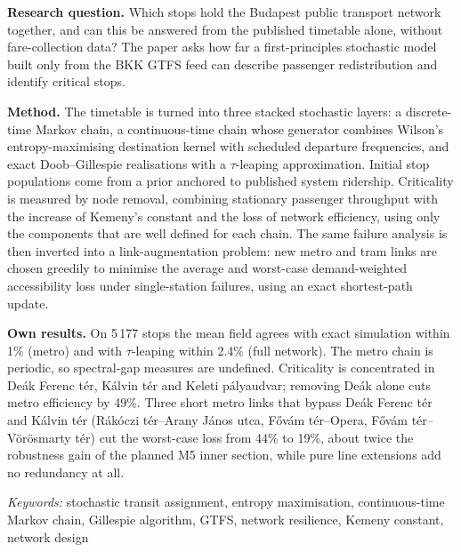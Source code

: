 \documentclass[12pt,a4paper]{article}
\theoremstyle{plain}
\theoremstyle{definition}
\theoremstyle{remark}
\begin{document}
\tdkfrontmatter
\tdkcover

\begin{tdkabsztrakt}
\textbf{Research question.} Which stops hold the Budapest public transport
network together, and can this be answered from the published timetable alone,
without fare-collection data? The paper asks how far a first-principles
stochastic model built only from the BKK GTFS feed can describe passenger
redistribution and identify critical stops.

\textbf{Method.} The timetable is turned into three stacked stochastic layers:
a discrete-time Markov chain, a continuous-time chain whose generator combines
Wilson's entropy-maximising destination kernel with scheduled departure
frequencies, and exact Doob--Gillespie realisations with a $\tau$-leaping
approximation. Initial stop populations come from a prior anchored to published
system ridership. Criticality is measured by node removal, combining stationary
passenger throughput with the increase of Kemeny's constant and the loss of
network efficiency, using only the components that are well defined for each
chain. The same failure analysis is then inverted into a link-augmentation
problem: new metro and tram links are chosen greedily to minimise the average
and worst-case demand-weighted accessibility loss under single-station
failures, using an exact shortest-path update.

\textbf{Own results.} On 5\,177 stops the mean field agrees with exact
simulation within 1\% (metro) and with $\tau$-leaping within 2.4\% (full
network). The metro chain is periodic, so spectral-gap measures are
undefined. Criticality is concentrated in De\'ak Ferenc t\'er, K\'alvin t\'er
and Keleti p\'alyaudvar; removing De\'ak alone cuts metro efficiency by 49\%.
Three short metro links that bypass De\'ak Ferenc t\'er and K\'alvin t\'er
(R\'ak\'oczi t\'er--Arany J\'anos utca, F\H{o}v\'am t\'er--Opera,
F\H{o}v\'am t\'er--V\"or\"osmarty t\'er) cut the worst-case loss from 44\% to
19\%, about twice the robustness gain of the planned M5 inner section, while
pure line extensions add no redundancy at all.

\medskip
\noindent\emph{Keywords:} stochastic transit assignment, entropy maximisation,
continuous-time Markov chain, Gillespie algorithm, GTFS, network resilience,
Kemeny constant, network design
\end{tdkabsztrakt}


\clearpage
\tableofcontents

\tdkmaintext
\end{document}
